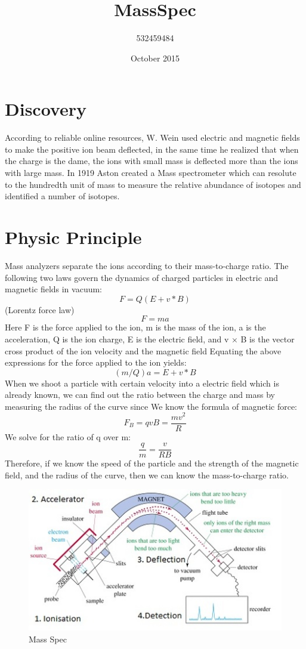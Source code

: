 \documentclass{article}
\title{MassSpec}
\author{532459484 }
\date{October 2015}
\begin{document}
\maketitle



\section{Discovery}
According to reliable online resources, W. Wein used electric and magnetic fields to make the positive ion beam deflected, in the same time he realized that when the charge is the dame, the ions with small mass is deflected more than the ions with large mass. In 1919 Aston created a Mass spectrometer which can resolute to the hundredth unit of mass to measure the relative abundance of isotopes and identified a number of isotopes.

\section{Physic Principle}
Mass analyzers separate the ions according to their mass-to-charge ratio. The following two laws govern the dynamics of charged particles in electric and magnetic fields in vacuum:
$$F=Q(E+v*B)$$(Lorentz force law)
$$F=ma$$
Here F is the force applied to the ion, m is the mass of the ion, a is the acceleration, Q is the ion charge, E is the electric field, and v × B is the vector cross product of the ion velocity and the magnetic field
Equating the above expressions for the force applied to the ion yields:
$$(m/Q)a=E+v*B$$
When we shoot a particle with certain velocity into a electric field which is already known, we can find out the ratio between the charge and mass by measuring the radius of the curve since We know the formula of magnetic force:
$$F_B=qvB=\frac{mv^2}{R}$$
We solve for the ratio of q over m:
$$\frac{q}{m}=\frac{v}{RB}$$
Therefore, if we know the speed of the particle and the strength of the magnetic field, and the radius of the curve, then we can know the mass-to-charge ratio. 

\begin{figure}[h!]
\centering
\includegraphics[scale=1.0]{mass.jpg}
\caption{Mass Spec}
\label{fig:Principle}
\end{figure}
\end{document}
